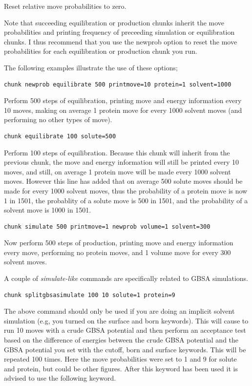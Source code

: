 \documentclass[letterpaper,10pt,english]{manual}
\begin{document}
Reset relative move probabilities to zero.

Note that succeeding equilibration or production chunks inherit the move probabilities and printing frequency of preceeding simulation or equilibration chunks. I thus recommend that you use the newprob option to reset the move probabilities for each equilibration or production chunk you run.

The following examples illustrate the use of these options;

\begin{Verbatim}[commandchars=@\[\]]
chunk newprob equilibrate 500 printmove=10 protein=1 solvent=1000
\end{Verbatim}

Perform 500 steps of equilibration, printing move and energy information every 10 moves, making on average 1 protein move for every 1000 solvent moves (and performing no other types of move).

\begin{Verbatim}[commandchars=@\[\]]
chunk equilibrate 100 solute=500
\end{Verbatim}

Perform 100 steps of equilibration. Because this chunk will inherit from the previous chunk, the move and energy information will still be printed every 10 moves, and still, on average 1 protein move will be made every 1000 solvent moves. However this line has added that on average 500 solute moves should be made for every 1000 solvent moves, thus the probability of a protein move is now 1 in 1501, the probablity of a solute move is 500 in 1501, and the probability of a solvent move is 1000 in 1501.

\begin{Verbatim}[commandchars=@\[\]]
chunk simulate 500 printmove=1 newprob volume=1 solvent=300
\end{Verbatim}

Now perform 500 steps of production, printing move and energy information every move, performing no protein moves, and 1 volume move for every 300 solvent moves.

A couple of \emph{simulate-like} commands are specifically related to GBSA simulations.
\begin{Verbatim}[commandchars=@\[\]]
chunk splitgbsasimulate 100 10 solute=1 protein=9
\end{Verbatim}

The above command should only be used if you are doing an implicit solvent simulation (e.g, you turned on the surface and born keywords). This will cause to run 10 moves with a crude GBSA potential and then perform an acceptance test based on the difference of energies between the crude GBSA potential and the GBSA potential you set with the cutoff, born and surface keywords. This will be repeated 100 times. Here the move probabilities were set to 1 and 9 for solute and protein, but could be other figures. After this keyword has been used it is advised to use the following keyword.
\end{document}
